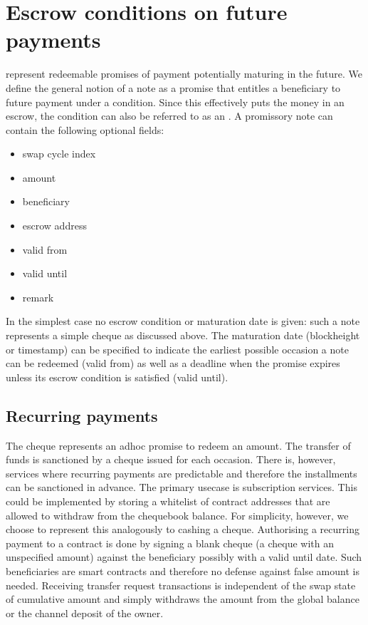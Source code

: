 \section{Escrow conditions on future payments}

 represent redeemable promises of payment potentially maturing in the future. We define the general notion of a note as a promise that entitles a beneficiary to future payment under a condition. Since this effectively puts the money in an escrow, the condition can also be referred to as an . A promissory note can contain the following optional fields:

  \begin{itemize}
    \item swap cycle index
    \item amount
    \item beneficiary
    \item escrow address
    \item valid from
    \item valid until
    \item remark
  \end{itemize}

In the simplest case no escrow condition or maturation date is given: such a note represents a simple cheque as discussed above. The maturation date (blockheight or timestamp) can be specified to indicate the earliest
possible occasion a note can be redeemed (valid from) as well as a deadline when the promise expires unless its escrow condition is satisfied (valid until). 

\subsection{Recurring payments}

The cheque represents an adhoc promise to redeem an amount. The transfer of funds is sanctioned by a cheque issued for each occasion. There is, however, services where recurring payments are predictable and therefore the installments can be sanctioned in advance. The primary usecase is subscription services. This could be implemented by storing a whitelist of contract addresses that are allowed to withdraw from the chequebook balance. For simplicity, however, we choose to represent this analogously to cashing a cheque. Authorising a recurring payment to a contract is done by signing a blank cheque (a cheque with an unspecified amount) against the beneficiary possibly with a valid until date. Such beneficiaries are smart contracts and therefore no defense against false amount is needed. Receiving transfer request transactions is independent of the swap state of cumulative amount and simply withdraws the amount from the global balance or the channel deposit of the owner.

